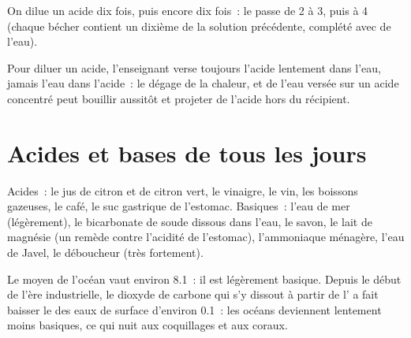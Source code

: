 \begin{omfigure}

{\small On dilue un acide dix fois, puis encore dix fois~: le  passe de
2 à 3, puis à 4 (chaque bécher contient un dixième de la solution
précédente, complété avec de l'eau).}
\end{omfigure}

\begin{inthelab}
Pour diluer un acide, l'enseignant verse toujours l'acide lentement dans
l'eau, jamais l'eau dans l'acide~: le  dégage de la chaleur, et
de l'eau versée sur un acide concentré peut bouillir aussitôt et
projeter de l'acide hors du récipient.
\end{inthelab}

\section{Acides et bases de tous les jours}

\begin{proposition}\label{prop:g9:acids-bases-ph:everyday}
Acides~: le jus de citron et de citron vert, le vinaigre, le vin, les
boissons gazeuses, le café, le suc gastrique de l'estomac. Basiques~:
l'eau de mer (légèrement), le bicarbonate de soude dissous dans l'eau,
le savon, le lait de magnésie (un remède contre l'acidité de
l'estomac), l'ammoniaque ménagère, l'eau de Javel, le déboucheur (très
fortement).
\end{proposition}

\begin{example}[Le pH de l'océan]\label{ex:g9:acids-bases-ph:ocean}
Le  moyen de l'océan vaut environ 8.1~: il est légèrement basique.
Depuis le début de l'ère industrielle, le dioxyde de carbone qui s'y
dissout à partir de l' a fait baisser le  des eaux de surface
d'environ 0.1~: les océans deviennent lentement moins basiques, ce qui
nuit aux coquillages et aux coraux.
\end{example}

